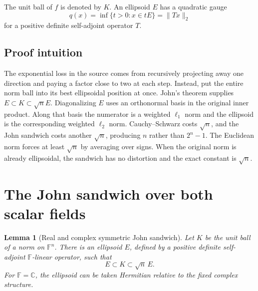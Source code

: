 \documentclass[11pt]{article}
\newtheorem{lemma}{Lemma}
\newcommand{\F}{\mathbb F}
\newcommand{\C}{\mathbb C}
\begin{document}
The unit ball of $f$ is denoted by $K$.  An ellipsoid $E$ has a quadratic
gauge
\[
 q(x)=\inf\{t>0:x\in tE\}=\|Tx\|_2
\]
for a positive definite self-adjoint operator $T$.

\subsection*{Proof intuition}

The exponential loss in the source comes from recursively projecting away
one direction and paying a factor close to two at each step.  Instead, put
the entire norm ball into its best ellipsoidal position at once.  John's
theorem supplies
\(E\subset K\subset\sqrt n E\).  Diagonalizing $E$ uses an orthonormal
basis in the original inner product.  Along that basis the numerator is a
weighted $\ell_1$ norm and the ellipsoid is the corresponding weighted
$\ell_2$ norm.  Cauchy--Schwarz costs $\sqrt n$, and the John sandwich costs
another $\sqrt n$, producing $n$ rather than $2^n-1$.  The Euclidean norm
forces at least $\sqrt n$ by averaging over signs.  When the original norm is
already ellipsoidal, the sandwich has no distortion and the exact constant is
$\sqrt n$.

\section{The John sandwich over both scalar fields}

\begin{lemma}[Real and complex symmetric John sandwich]\label{lem:john}
Let $K$ be the unit ball of a norm on $\F^n$.  There is an ellipsoid $E$,
defined by a positive definite self-adjoint $\F$-linear operator, such that
\[
 E\subset K\subset\sqrt n\,E.
\]
For $\F=\C$, the ellipsoid can be taken Hermitian relative to the fixed
complex structure.
\end{lemma}
\end{document}
